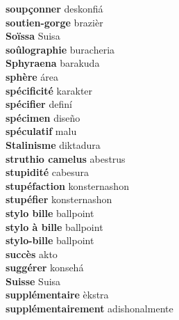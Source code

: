 \textbf{ soupçonner  } deskonfiá \\
\textbf{ soutien-gorge  } brazièr \\
\textbf{ Soïssa  } Suisa \\
\textbf{ soûlographie  } buracheria \\
\textbf{ Sphyraena  } barakuda \\
\textbf{ sphère  } área \\
\textbf{ spécificité  } karakter \\
\textbf{ spécifier  } definí \\
\textbf{ spécimen  } diseño \\
\textbf{ spéculatif  } malu \\
\textbf{ Stalinisme  } diktadura \\
\textbf{ struthio camelus  } abestrus \\
\textbf{ stupidité  } cabesura \\
\textbf{ stupéfaction  } konsternashon \\
\textbf{ stupéfier  } konsternashon \\
\textbf{ stylo bille  } ballpoint \\
\textbf{ stylo à bille  } ballpoint \\
\textbf{ stylo-bille  } ballpoint \\
\textbf{ succès  } akto \\
\textbf{ suggérer  } konsehá \\
\textbf{ Suisse  } Suisa \\
\textbf{ supplémentaire  } èkstra \\
\textbf{ supplémentairement  } adishonalmente \\
